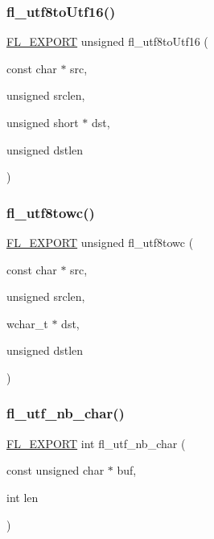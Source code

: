 \subsubsection{\texorpdfstring{fl\+\_\+utf8to\+Utf16()}{fl\_utf8toUtf16()}}
{\footnotesize\ttfamily \hyperlink{_fl___export_8_h_aa9ba29a18aee9d738370a06eeb4470fc}{F\+L\+\_\+\+E\+X\+P\+O\+RT} unsigned fl\+\_\+utf8to\+Utf16 (\begin{DoxyParamCaption}\item[{const char $\ast$}]{src,  }\item[{unsigned}]{srclen,  }\item[{unsigned short $\ast$}]{dst,  }\item[{unsigned}]{dstlen }\end{DoxyParamCaption})}

\mbox{\label{group__fl__unicode_ga0f85a780de2aedbe38e27bf5d6fc53f1}} 
\subsubsection{\texorpdfstring{fl\+\_\+utf8towc()}{fl\_utf8towc()}}
{\footnotesize\ttfamily \hyperlink{_fl___export_8_h_aa9ba29a18aee9d738370a06eeb4470fc}{F\+L\+\_\+\+E\+X\+P\+O\+RT} unsigned fl\+\_\+utf8towc (\begin{DoxyParamCaption}\item[{const char $\ast$}]{src,  }\item[{unsigned}]{srclen,  }\item[{wchar\+\_\+t $\ast$}]{dst,  }\item[{unsigned}]{dstlen }\end{DoxyParamCaption})}

\mbox{\label{group__fl__unicode_ga6ee2c4b4612eacf1ee4cdc3e5714c80a}} 
\subsubsection{\texorpdfstring{fl\+\_\+utf\+\_\+nb\+\_\+char()}{fl\_utf\_nb\_char()}}
{\footnotesize\ttfamily \hyperlink{_fl___export_8_h_aa9ba29a18aee9d738370a06eeb4470fc}{F\+L\+\_\+\+E\+X\+P\+O\+RT} int fl\+\_\+utf\+\_\+nb\+\_\+char (\begin{DoxyParamCaption}\item[{const unsigned char $\ast$}]{buf,  }\item[{int}]{len }\end{DoxyParamCaption})}

